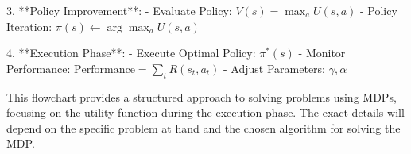 3. **Policy Improvement**:
   - Evaluate Policy: \( V(s) = \max_a U(s, a) \)
   - Policy Iteration: \( \pi(s) \leftarrow \arg\max_a U(s, a) \)

4. **Execution Phase**:
   - Execute Optimal Policy: \( \pi^*(s) \)
   - Monitor Performance: \( \text{Performance} = \sum_t R(s_t, a_t) \)
   - Adjust Parameters: \( \gamma, \alpha \)

This flowchart provides a structured approach to solving problems using MDPs, focusing on the utility function during the execution phase. The exact details will depend on the specific problem at hand and the chosen algorithm for solving the MDP.